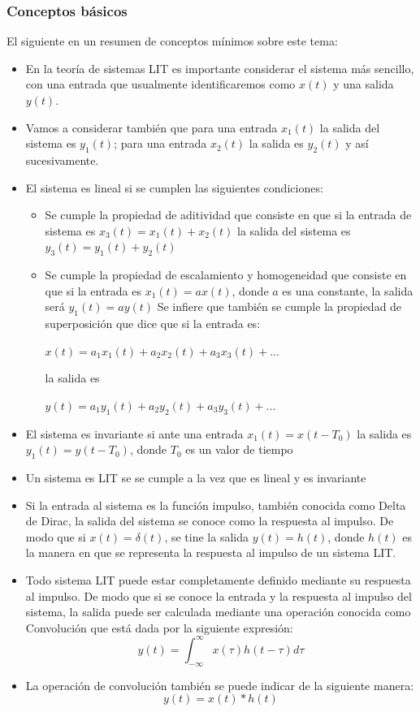 \subsubsection{Conceptos básicos}
El siguiente en un resumen de conceptos mínimos sobre este tema:
\begin{itemize} 
\item En la teoría de sistemas LIT es importante considerar el sistema más sencillo, con una entrada que usualmente identificaremos como $x(t)$ y una salida $y(t)$.
\item  Vamos a considerar también que para una entrada $x_1(t)$ la salida del sistema es $y_1(t)$; para una entrada $x_2(t)$ la salida es $y_2(t)$ y así sucesivamente.  
\item El sistema es lineal si se cumplen las siguientes condiciones:
    \begin{itemize}
    \item  Se cumple la propiedad de aditividad que consiste en que si la entrada de sistema es $x_3(t)=x_1(t)+x_2(t) $ la salida del sistema es $ y_3(t)=y_1(t)+y_2(t)$
    \item Se cumple la propiedad de escalamiento y homogeneidad que consiste en que si la entrada es $x_1(t)=a x(t)$, donde $a$ es una constante, la salida será $y_1(t)=ay(t)$
    Se infiere que también se cumple la propiedad de superposición que dice que si la entrada es:
    \begin{center}
    $x(t)=a_1x_1(t)+a_2x_2(t)+a_3x_3(t)+ ...$
    \end{center}
    la salida es
    \begin{center}
    $y(t)=a_1y_1(t)+a_2y_2(t)+a_3y_3(t)+ ...$
    \end{center}
    \end{itemize}
\item El sistema es invariante si ante una entrada $x_1(t)=x(t-T_0)$ la salida es $y_1(t)=y(t-T_0)$, donde $T_0$ es un valor de tiempo
\item Un sistema es LIT se se cumple a la vez que es lineal y es invariante
\item Si la entrada al sistema es la función impulso, también conocida como Delta de Dirac, la salida del sistema se conoce como la respuesta al impulso. De modo que si  $x(t)=\delta (t)$, se tine la salida $y(t)=h(t)$, donde $h(t)$ es la manera en que se representa la respuesta al impulso de un sistema LIT.

\item Todo sistema LIT puede estar completamente definido mediante su respuesta al impulso. De modo que si se conoce la entrada y la respuesta al impulso del sistema, la salida puede ser calculada mediante una operación conocida como Convolución que está dada por la siguiente expresión: 
\begin{equation} \label{hob1}
	 y(t)= \int_{-\infty}^{\infty} x(\tau)h(t-\tau)d \tau 
\end{equation}
\item La operación de convolución también se puede indicar de la siguiente manera:
\begin{equation} \label{convolucion}
	 y(t)= x(t)*h(t) 
\end{equation}


\end{itemize}
